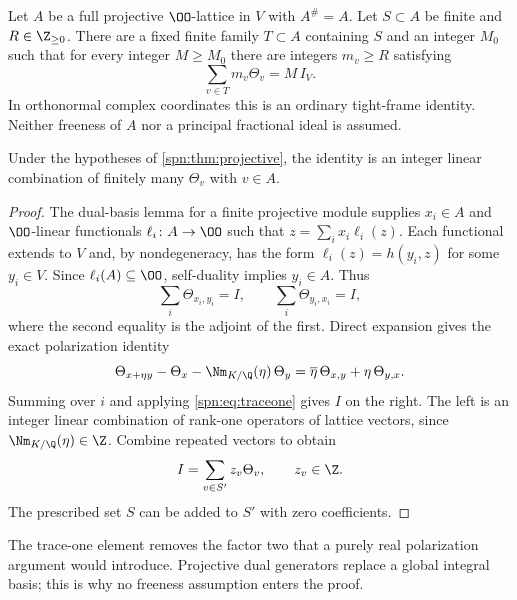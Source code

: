 \begin{theorem}\label{spn:thm:projective}
Let $A$ be a full projective $\OO$-lattice in $V$ with $A^\#=A$. Let
$S\subset A$ be finite and $R\in\Z_{\ge0}$. There are a fixed finite family
$T\subset A$ containing $S$ and an integer $M_0$ such that for every integer
$M\ge M_0$ there are integers $m_v\ge R$ satisfying
\begin{equation}\label{spn:eq:projective-frame}
 \sum_{v\in T}m_v\Theta_v=M\,I_V .
\end{equation}
In orthonormal complex coordinates this is an ordinary tight-frame identity.
Neither freeness of $A$ nor a principal fractional ideal is assumed.
\end{theorem}

\begin{lemma}\label{spn:lem:signed}
Under the hypotheses of \cref{spn:thm:projective}, the identity is an integer
linear combination of finitely many $\Theta_v$ with $v\in A$.
\end{lemma}

\begin{proof}
The dual-basis lemma for a finite projective module supplies $x_i\in A$ and
$\OO$-linear functionals $\ell_i\colon A\to\OO$ such that
$z=\sum_ix_i\ell_i(z)$. Each functional extends to $V$ and, by
nondegeneracy, has the form $\ell_i(z)=h(y_i,z)$ for some $y_i\in V$. Since
$\ell_i(A)\subseteq\OO$, self-duality implies $y_i\in A$. Thus
\[
 \sum_i\Theta_{x_i,y_i}=I,\qquad\sum_i\Theta_{y_i,x_i}=I,
\]
where the second equality is the adjoint of the first. Direct expansion gives
the exact polarization identity
\begin{equation}\label{spn:eq:polarization}
 \Theta_{x+\eta y}-\Theta_x-\Nm_{K/\Q}(\eta)\,\Theta_y
 =\overline\eta\,\Theta_{x,y}+\eta\,\Theta_{y,x}.
\end{equation}
Summing over $i$ and applying \eqref{spn:eq:traceone} gives $I$ on the right.
The left is an integer linear combination of rank-one operators of lattice
vectors, since $\Nm_{K/\Q}(\eta)\in\Z$. Combine repeated vectors to obtain
\begin{equation}\label{spn:eq:signed-id}
 I=\sum_{v\in S'}z_v\Theta_v,\qquad z_v\in\Z .
\end{equation}
The prescribed set $S$ can be added to $S'$ with zero coefficients.
\end{proof}

The trace-one element removes the factor two that a purely real polarization
argument would introduce. Projective dual generators replace a global integral
basis; this is why no freeness assumption enters the proof.

